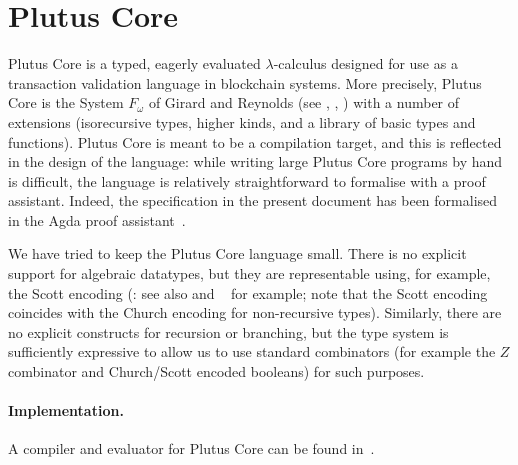 \documentclass[a4paper]{article}
\begin{document}
%


\maketitle

\thispagestyle{plain}
\pagestyle{plain}



\section{Plutus Core}
Plutus Core is a typed, eagerly evaluated $\lambda$-calculus designed
for use as a transaction validation language in blockchain
systems. More precisely, Plutus Core is the System $F_\omega$ of
Girard and Reynolds (see \citep{Girard-thesis},
\citep{Reynolds-type-structure}, \citep[\S30]{Pierce:TAPL}) with a
number of extensions (isorecursive types, higher kinds, and a library
of basic types and functions).  Plutus Core is meant to be a
compilation target, and this is reflected in the design of the
language: while writing large Plutus Core programs by hand is
difficult, the language is relatively straightforward to formalise
with a proof assistant.  Indeed, the specification in the present
document has been formalised in the Agda proof assistant~\citep{Agda}.

We have tried to keep the Plutus Core language small. There is no
explicit support for algebraic datatypes, but they are representable
using, for example, the Scott encoding (\citep{Scott-encoding}: see
also \citep{Koopman:2014} and ~\citep{Geuvers-2014} for example; note that
the Scott encoding coincides with the Church encoding for
non-recursive types). Similarly, there are no explicit constructs for
recursion or branching, but the type system is sufficiently expressive
to allow us to use standard combinators (for example the $Z$
combinator and Church/Scott encoded booleans) for such purposes.

\paragraph{Implementation.} A compiler and evaluator for Plutus Core can be found
in~\citep{Plutus-exe-repo}.
\end{document}
